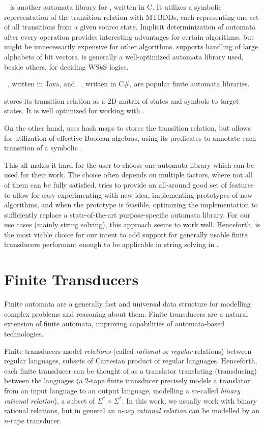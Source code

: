 \mona~\cite{mona} is another automata library for \dfas, written in C.
It utilizes a symbolic representation of the transition relation with MTBDDs, each representing one set of all transitions from a given source state.
Implicit determinization of automata after every operation provides interesting advantages for certain algorithms, but might be unnecessarily expensive for other algorithms.
\mona supports handling of large alphabets of bit vectors.
\mona is generally a well-optimized automata library used, beside others, for deciding WS$k$S logics.

\automatajar~\cite{automatajar}, written in Java, and \automatanet~\cite{automatanet}, written in C\#, are popular finite automata libraries.

\automatajar stores its transition relation as a 2D matrix of states and symbols to target states.
It is well optimized for working with \dfas.

On the other hand, \automatanet uses hash maps to stores the transition relation, but allows for utilization of effective Boolean algebras, using its predicates to annotate each transition of a symbolic \nfa.

This all makes it hard for the user to choose one automata library which can be used for their work.
The choice often depends on multiple factors, where not all of them can be fully satisfied.
\mata tries to provide an all-around good set of features to allow for easy experimenting with new idea, implementing prototypes of new algorithms, and when the prototype is feasible, optimizing the implementation to sufficiently replace a state-of-the-art purpose-specific automata library.
For our use cases (mainly string solving), this approach seems to work well.
Henceforth, \mata is the most viable choice for our intent to add support for generally usable finite transducers performant enough to be applicable in string solving in \noodler.

\section{Finite Transducers}

Finite automata are a generally fast and universal data structure for modelling complex problems and reasoning about them.
Finite transducers are a natural extension of finite automata, improving capabilities of automata-based technologies.

Finite transducers model \emph{relations} (called \emph{rational} or \emph{regular} relations) between regular languages, subsets of Cartesian product of regular languages.
Henceforth, each finite transducer can be thought of as a translator translating (transducing) between the languages (a 2-tape finite transducer precisely models a translator from an input language to an output language, modelling a so-called \emph{binary rational relation}), a subset of $\Sigma^* \times \Sigma^*$.
In this work, we usually work with binary rational relations, but in general an \emph{n-ary rational relation} can be modelled by an $n$-tape transducer.

